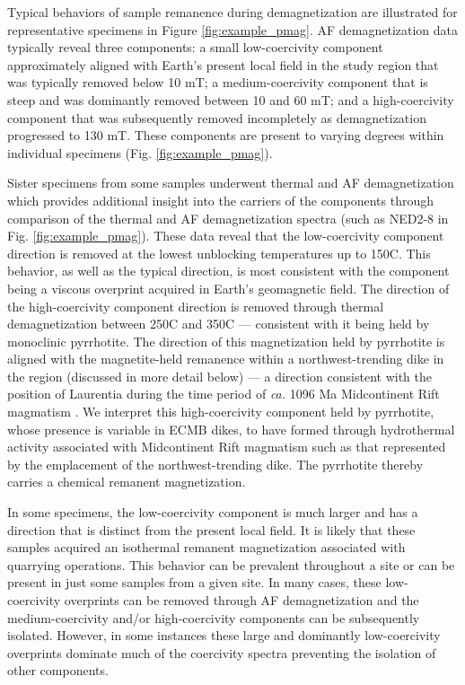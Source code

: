 \documentclass[draft]{agujournal2019}
\begin{document}
Typical behaviors of sample remanence during demagnetization are illustrated for representative specimens in Figure \ref{fig:example_pmag}. AF demagnetization data typically reveal three components: a small low-coercivity component approximately aligned with Earth's present local field in the study region that was typically removed below 10 mT; a medium-coercivity component that is steep and was dominantly removed between 10 and 60 mT; and a high-coercivity component that was subsequently removed incompletely as demagnetization progressed to 130 mT. These components are present to varying degrees within individual specimens (Fig. \ref{fig:example_pmag}).

Sister specimens from some samples underwent thermal and AF demagnetization which provides additional insight into the carriers of the components through comparison of the thermal and AF demagnetization spectra (such as NED2-8 in Fig. \ref{fig:example_pmag}). These data reveal that the low-coercivity component direction is removed at the lowest unblocking temperatures up to 150\textdegree C. This behavior, as well as the typical direction, is most consistent with the component being a viscous overprint acquired in Earth's geomagnetic field. The direction of the high-coercivity component direction is removed through thermal demagnetization between 250\textdegree C and 350\textdegree C --- consistent with it being held by monoclinic pyrrhotite. The direction of this magnetization held by pyrrhotite is aligned with the magnetite-held remanence within a northwest-trending dike in the region (discussed in more detail below) --- a direction consistent with the position of Laurentia during the time period of \textit{ca.} 1096 Ma Midcontinent Rift magmatism \cite{Swanson-Hysell2020a}. We interpret this high-coercivity component held by pyrrhotite, whose presence is variable in ECMB dikes, to have formed through hydrothermal activity associated with Midcontinent Rift magmatism such as that represented by the emplacement of the northwest-trending dike. The pyrrhotite thereby carries a chemical remanent magnetization.

In some specimens, the low-coercivity component is much larger and has a direction that is distinct from the present local field. It is likely that these samples acquired an isothermal remanent magnetization associated with quarrying operations. This behavior can be prevalent throughout a site or can be present in just some samples from a given site. In many cases, these low-coercivity overprints can be removed through AF demagnetization and the medium-coercivity and/or high-coercivity components can be subsequently isolated. However, in some instances these large and dominantly low-coercivity overprints dominate much of the coercivity spectra preventing the isolation of other components.
\end{document}
